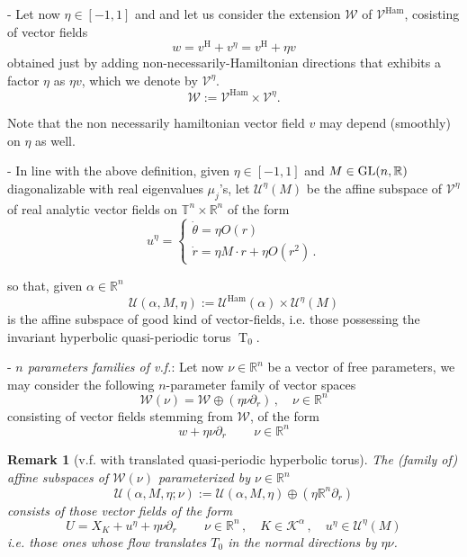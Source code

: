 \documentclass[oneside, 11pt]{amsbook}
\newcommand{\U}{\mathcal{U}}
\newcommand{\T}{\mathbb{T}}
\newcommand{\R}{\mathbb{R}}
\newcommand{\teta}{\theta}
\newcommand{\eqsys}[1]{{\left\{\begin{array}{ll}#1\end{array}\right.}}
\newcommand{\vh}{v^{\text{H}}} %
\newcommand{\Uh}{\mathcal{U}^{\operatorname{Ham}}}
\newcommand{\Vh}{\mathcal{V}^{\operatorname{Ham}}}
\def\U{{\mathcal U}}
\newcommand{\cK}{{\mathcal K}}
\newcommand{\cU}{{\mathcal U}}
\newcommand{\cV}{{\mathcal V}}
\newcommand{\cW}{{\mathcal W}}
\newcommand{\0}{{(0)}}
\newcommand{\3}{{(3)}}
\newtheorem{rmk}{Remark}[section]
\numberwithin{equation}{section}
\numberwithin{defn}{section}
\numberwithin{prop}{section}
\numberwithin{cor}{section}
\numberwithin{lemma}{section}
\numberwithin{rmk}{section}
\numberwithin{corollary}{section}
\newcommand{\To}{\operatorname{T}_0}
\begin{document}
\medskip

- Let now $\eta \in [-1,1]$  and and let us consider the extension $\cW$ of $\Vh$,  cosisting of vector fields $$w = \vh + v^\eta = \vh + \eta v$$ obtained just by adding non-necessarily-Hamiltonian directions that exhibits a factor $\eta$ as $\eta v$, which we denote by $\cV^\eta$.  
\begin{equation}\label{hybrid vf}
\cW := \Vh\times\cV^\eta .
\end{equation}

Note that the non necessarily hamiltonian vector field $v$ may depend (smoothly) on $\eta$ as well.

- In line with the above definition,  given $\eta\in [-1,1]$ and $M \in {\rm GL}(n,\R)$ diagonalizable with real eigenvalues $\mu_j$'s, let $\cU^\eta(M)$ be the affine subspace of $\cV^\eta$ of real analytic vector fields on $\T^n\times\R^n$ of the form  
\begin{equation}
	u^\eta = \eqsys{\dot{\teta} =  \eta O(r)\\
		\dot r = \eta M\cdot r +\eta O(r^2) \,. }
	\label{u}
\end{equation}

so that, given $\alpha\in\R^n$ 
\begin{equation}\label{good U}
	\U(\alpha,M,\eta) := \Uh(\alpha)\times\cU^\eta(M)
\end{equation}
is the affine subspace of good kind of vector-fields, i.e. those  possessing the invariant hyperbolic quasi-periodic torus $\To$.

- \textit{$n$ parameters families of v.f.}: 
Let now $\nu \in \R^n$ be a vector of free parameters, we may consider the following $n$-parameter family of vector spaces  {$$\cW(\nu) = \cW\oplus (\eta\nu\partial_r)\,,\quad \nu\in\R^n$$} consisting of vector fields stemming from $\cW$, of the form 
\begin{equation}
	w + \eta \nu\partial_r\, \quad \quad \nu\in\R^n
	\end{equation} 



\begin{rmk}[v.f. with translated quasi-periodic hyperbolic torus]
 The (family of) affine subspaces of $\cW(\nu)$  parameterized by $\nu\in\R^n$ 
\begin{equation}
	\label{quasi-good U}
\cU(\alpha,M,\eta;\nu) :=\U(\alpha,M,\eta)\oplus(\eta\R^n\partial_r)
\end{equation}
consists of those vector fields of the form
 $$
 U = X_K + u^\eta + \eta\nu\partial_r\,\quad \quad \nu\in\R^n\,,\quad K\in\cK^\alpha\,,\quad u^\eta\in\cU^\eta(M)
 $$
 i.e. those ones whose flow translates $T_0$ in the normal directions by $\eta\nu$.
 \end{rmk}
\end{document}
